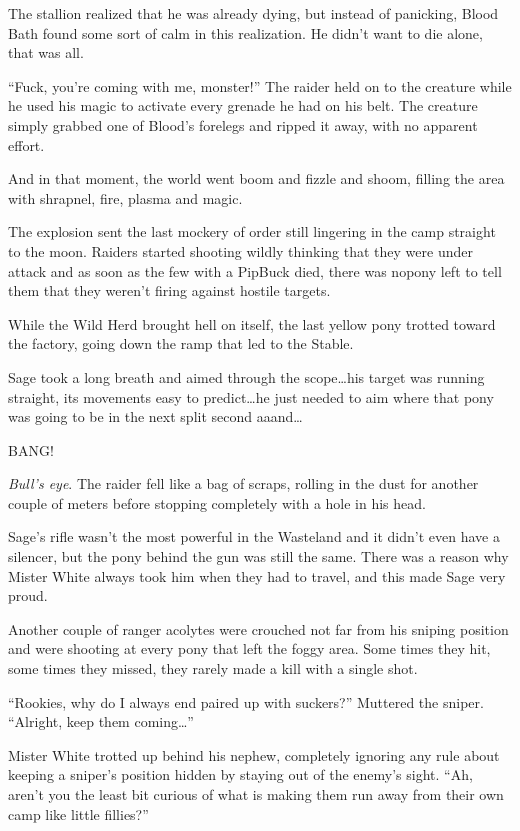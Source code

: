 The stallion realized that he was already dying, but instead of panicking, Blood Bath found some sort of calm in this realization. He didn't want to die alone, that was all.

``Fuck, you're coming with me, monster!'' The raider held on to the creature while he used his magic to activate every grenade he had on his belt. The creature simply grabbed one of Blood's forelegs and ripped it away, with no apparent effort.

And in that moment, the world went boom and fizzle and shoom, filling the area with shrapnel, fire, plasma and magic.

The explosion sent the last mockery of order still lingering in the camp straight to the moon. Raiders started shooting wildly thinking that they were under attack and as soon as the few with a PipBuck died, there was nopony left to tell them that they weren't firing against hostile targets.

While the Wild Herd brought hell on itself, the last yellow pony trotted toward the factory, going down the ramp that led to the Stable.

\horizonline


Sage took a long breath and aimed through the scope\dots his target was running straight, its movements easy to predict\dots he just needed to aim where that pony was going to be in the next split second aaand\dots

BANG!

\emph{Bull's eye}. The raider fell like a bag of scraps, rolling in the dust for another couple of meters before stopping completely with a hole in his head.

Sage's rifle wasn't the most powerful in the Wasteland and it didn't even have a silencer, but the pony behind the gun was still the same. There was a reason why Mister White always took him when they had to travel, and this made Sage very proud.

Another couple of ranger acolytes were crouched not far from his sniping position and were shooting at every pony that left the foggy area. Some times they hit, some times they missed, they rarely made a kill with a single shot.

``Rookies, why do I always end paired up with suckers?'' Muttered the sniper. ``Alright, keep them coming\dots''

Mister White trotted up behind his nephew, completely ignoring any rule about keeping a sniper's position hidden by staying out of the enemy's sight. ``Ah, aren't you the least bit curious of what is making them run away from their own camp like little fillies?''

